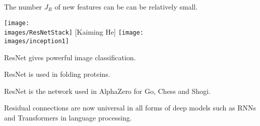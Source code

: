 {{\vfill
The number $J_R$ of new features can be can be relatively small.
}


\centerline{\texttt{[image: \\images/ResNetStack]} {\large [Kaiming He]} \texttt{[image: \\images/inception1]}}


ResNet gives powerful image classification.

\vfill
ResNet is used in folding proteins.

\vfill
ResNet is the network used in AlphaZero for Go, Chess and Shogi.

\vfill
Residual connections are now universal in all forms of deep models such as RNNs and Transformers in language processing.


}

